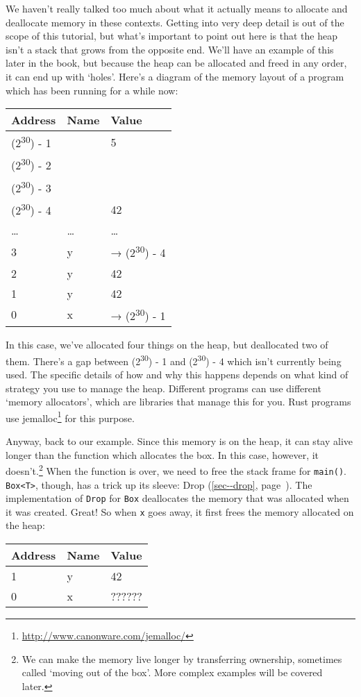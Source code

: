 \documentclass[a4paper,]{book}
\renewcommand*{\hyperref}[2][\ar]{%
  \def\ar{#2}%
  #2 (\autoref{#1}, page~\pageref{#1})}
\renewcommand{\href}[2]{#2\footnote{\url{#1}}}
\begin{document}
We haven't really talked too much about what it actually means to
allocate and deallocate memory in these contexts. Getting into very deep
detail is out of the scope of this tutorial, but what's important to
point out here is that the heap isn't a stack that grows from the
opposite end. We'll have an example of this later in the book, but
because the heap can be allocated and freed in any order, it can end up
with `holes'. Here's a diagram of the memory layout of a program which
has been running for a while now:

\begin{longtable}[c]{@{}lll@{}}
\toprule
Address & Name & Value\tabularnewline
\midrule
\endhead
(2\textsuperscript{30}) - 1 & & 5\tabularnewline
(2\textsuperscript{30}) - 2 & &\tabularnewline
(2\textsuperscript{30}) - 3 & &\tabularnewline
(2\textsuperscript{30}) - 4 & & 42\tabularnewline
\ldots{} & \ldots{} & \ldots{}\tabularnewline
3 & y & → (2\textsuperscript{30}) - 4\tabularnewline
2 & y & 42\tabularnewline
1 & y & 42\tabularnewline
0 & x & → (2\textsuperscript{30}) - 1\tabularnewline
\bottomrule
\end{longtable}

In this case, we've allocated four things on the heap, but deallocated
two of them. There's a gap between (2\textsuperscript{30}) - 1 and
(2\textsuperscript{30}) - 4 which isn't currently being used. The
specific details of how and why this happens depends on what kind of
strategy you use to manage the heap. Different programs can use
different `memory allocators', which are libraries that manage this for
you. Rust programs use
\href{http://www.canonware.com/jemalloc/}{jemalloc} for this purpose.

Anyway, back to our example. Since this memory is on the heap, it can
stay alive longer than the function which allocates the box. In this
case, however, it doesn't.\footnote{We can make the memory live longer
  by transferring ownership, sometimes called `moving out of the box'.
  More complex examples will be covered later.} When the function is
over, we need to free the stack frame for \texttt{main()}.
\texttt{Box\textless{}T\textgreater{}}, though, has a trick up its
sleeve: \hyperref[sec--drop]{Drop}. The implementation of \texttt{Drop}
for \texttt{Box} deallocates the memory that was allocated when it was
created. Great! So when \texttt{x} goes away, it first frees the memory
allocated on the heap:

\begin{longtable}[c]{@{}lll@{}}
\toprule
Address & Name & Value\tabularnewline
\midrule
\endhead
1 & y & 42\tabularnewline
0 & x & ??????\tabularnewline
\bottomrule
\end{longtable}
\end{document}
